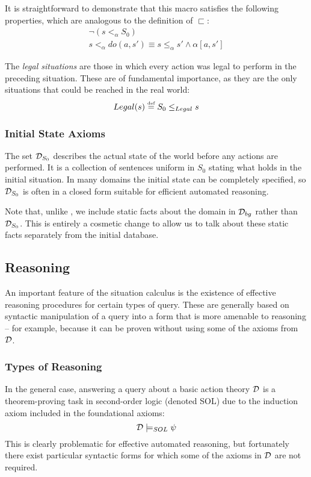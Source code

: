 It is straightforward to demonstrate that this macro satisfies the
following properties, which are analogous to the definition of $\sqsubset$:\begin{gather*}
\neg\left(s<_{\alpha}S_{0}\right)\\
s<_{\alpha}do(a,s')\equiv s\leq_{\alpha}s'\wedge\alpha[a,s']\end{gather*}


The \emph{legal situations} are those in which every action was legal
to perform in the preceding situation. These are of fundamental importance,
as they are the only situations that could be reached in the real
world:\[
Legal(s)\stackrel{\mbox{\tiny def}}{=} S_{0}\leq_{Legal}s\]



\subsubsection{Initial State Axioms}

The set $\mathcal{D}_{S_{0}}$ describes the actual state of the world before
any actions are performed. It is a collection of sentences uniform
in $S_{0}$ stating what holds in the initial situation. In many domains
the initial state can be completely specified, so $\mathcal{D}_{S_{0}}$ is
often in a closed form suitable for efficient automated reasoning.

Note that, unlike \citep{levesque98sc_foundations,pirri99contributions_sitcalc,reiter01kia},
we include static facts about the domain in $\mathcal{D}_{bg}$ rather than
$\mathcal{D}_{S_{0}}$. This is entirely a cosmetic change to allow us to
talk about these static facts separately from the initial database.


\subsection{Reasoning}

An important feature of the situation calculus is the existence of
effective reasoning procedures for certain types of query. These are
generally based on syntactic manipulation of a query into a form that
is more amenable to reasoning -- for example, because it can be proven
without using some of the axioms from $\mathcal{D}$.


\subsubsection{Types of Reasoning}

In the general case, answering a query about a basic action theory
$\mathcal{D}$ is a theorem-proving task in second-order logic (denoted SOL)
due to the induction axiom included in the foundational axioms:\[
\mathcal{D}\models_{SOL}\psi\]
 This is clearly problematic for effective automated reasoning, but
fortunately there exist particular syntactic forms for which some
of the axioms in $\mathcal{D}$ are not required.

